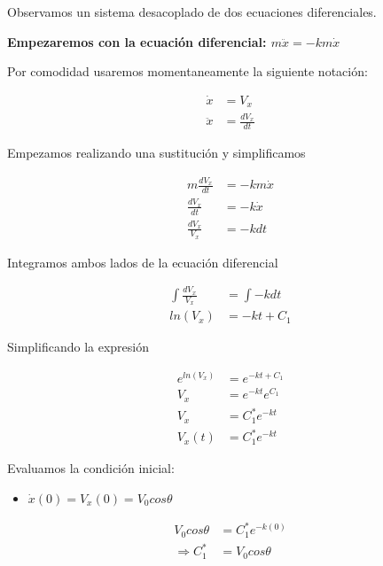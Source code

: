 Observamos un sistema desacoplado de dos ecuaciones diferenciales.

\vspace*{5 mm}

\textbf{Empezaremos con la ecuación diferencial: $ m\ddot{x} = -km\dot{x} $}

\vspace*{5 mm}

Por comodidad usaremos momentaneamente la siguiente notación: 

\begin{align*}
    \dot{x} &= V_{x} \\
    \ddot{x} &= \frac{dV_{x}}{dt}
\end{align*}

Empezamos realizando una sustitución y simplificamos

\begin{align*}
    m\frac{d V_{x}}{dt} &= -km\dot{x} \\
    \frac{d V_{x}}{dt} &= -k\dot{x} \\
    \frac{ d V_{x}}{V_{x}} &= -kdt 
\end{align*}

Integramos  ambos lados de la ecuación diferencial

\begin{align*}
    \int \frac{ d V_{x}}{V_{x}} &= \int -kdt \\
    ln(V_{x}) &= -kt+C_{1}
\end{align*}

Simplificando la expresión

\begin{align*}
    e^{ln(V_{x})} &= e^{-kt+C_{1}} \\
    V_{x} &= e^{-kt} e^{C_{1}} \\
    V_{x} &= C_{1}^{*}e^{-kt}  \\
    V_{x} (t) &= C_{1}^{*}e^{-kt}
\end{align*}

Evaluamos la condición inicial:

\begin{itemize}
    \item $\dot{x} (0) = V_{x} (0) = V_{0}cos \theta$
\end{itemize}

\begin{align*}
    V_{0}cos \theta &=  C_{1}^{*}e^{-k(0)} \\
    \Rightarrow C_{1}^{*} &= V_{0}cos \theta
\end{align*}

